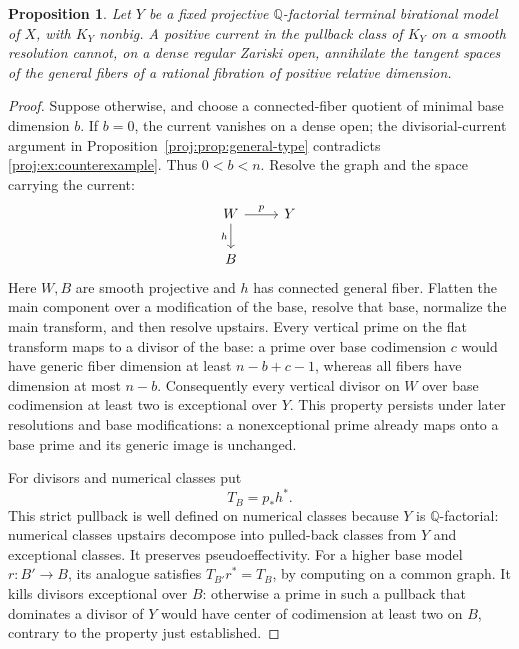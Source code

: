 \documentclass[11pt,letterpaper]{article}
\newtheorem{proposition}[theorem]{Proposition}
\theoremstyle{definition}
\theoremstyle{remark}
\begin{document}
\begin{proposition}\label{proj:prop:no-pullback}
Let \(Y\) be a fixed projective \(\mathbb{Q}\)-factorial terminal
birational model of \(X\), with \(K_Y\) nonbig. A positive current
in the pullback class of \(K_Y\) on a smooth resolution cannot,
on a dense regular Zariski open, annihilate the tangent spaces
of the general fibers of a rational fibration of positive
relative dimension.
\end{proposition}
\begin{proof}
Suppose otherwise, and choose a connected-fiber quotient of
minimal base dimension \(b\). If \(b=0\), the current vanishes on
a dense open; the divisorial-current argument in
Proposition~\ref{proj:prop:general-type} contradicts
\eqref{proj:ex:counterexample}. Thus \(0<b<n\).
Resolve the graph and the space carrying the current:
\[
 \begin{tikzcd}
 W \arrow[r,"p"] \arrow[d,"h"'] & Y \\
 B &
 \end{tikzcd}
\]
Here \(W,B\) are smooth projective and \(h\) has connected
general fiber. Flatten the main component over a modification of
the base, resolve that base, normalize the main transform, and
then resolve upstairs. Every vertical prime on the flat
transform maps to a divisor of the base: a prime over base
codimension \(c\) would have generic fiber dimension at least
\(n-b+c-1\), whereas all fibers have dimension at most \(n-b\).
Consequently every vertical divisor
on \(W\) over base codimension at least two is exceptional over
\(Y\). This property persists under later resolutions and base
modifications: a nonexceptional prime already maps onto a base
prime and its generic image is unchanged.

For divisors and numerical classes put
\[
 T_B=p_*h^*.
\]
This strict pullback is well defined on numerical classes because
\(Y\) is \(\mathbb{Q}\)-factorial: numerical classes upstairs decompose
into pulled-back classes from \(Y\) and exceptional classes.
It preserves pseudoeffectivity. For a higher base model
\(r:B'\to B\), its analogue satisfies
\(T_{B'}r^*=T_B\), by computing on a common graph.
It kills divisors exceptional over \(B\): otherwise a prime
in such a pullback that dominates a divisor of \(Y\) would
have center of codimension at least two on \(B\), contrary
to the property just established.


\end{proof}
\end{document}
